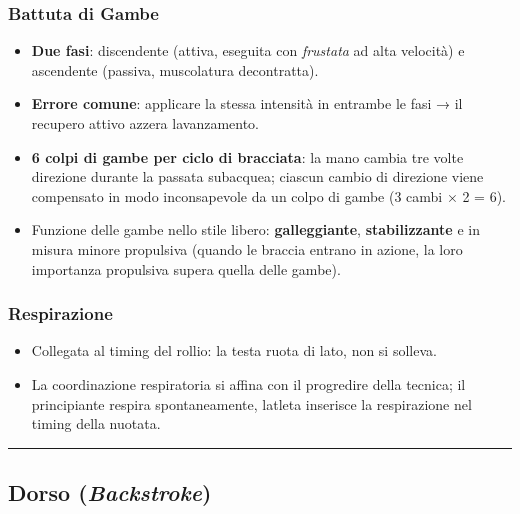 \documentclass[a4paper,11pt]{article}
\providecommand{\tightlist}{%
  \setlength{\itemsep}{0pt}\setlength{\parskip}{0pt}}
\begin{document}
\subsubsection{Battuta di Gambe}\label{battuta-di-gambe}

\begin{itemize}
      \tightlist
      \item
            \textbf{Due fasi}: discendente (attiva, eseguita con \emph{frustata}
            ad alta velocità) e ascendente (passiva, muscolatura decontratta).
      \item
            \textbf{Errore comune}: applicare la stessa intensità in entrambe le
            fasi → il recupero attivo azzera l\textquotesingle avanzamento.
      \item
            \textbf{6 colpi di gambe per ciclo di bracciata}: la mano cambia tre
            volte direzione durante la passata subacquea; ciascun cambio di
            direzione viene compensato in modo inconsapevole da un colpo di gambe
            (3 cambi × 2 = 6).
      \item
            Funzione delle gambe nello stile libero: \textbf{galleggiante},
            \textbf{stabilizzante} e in misura minore propulsiva (quando le
            braccia entrano in azione, la loro importanza propulsiva supera quella
            delle gambe).
\end{itemize}

\subsubsection{Respirazione}\label{respirazione}

\begin{itemize}
      \tightlist
      \item
            Collegata al timing del rollio: la testa ruota di lato, non si
            solleva.
      \item
            La coordinazione respiratoria si affina con il progredire della
            tecnica; il principiante respira spontaneamente,
            l\textquotesingle atleta inserisce la respirazione nel timing della
            nuotata.
\end{itemize}

\begin{center}\rule{0.5\linewidth}{0.5pt}\end{center}

\subsection{\texorpdfstring{Dorso
            (\emph{Backstroke})}{Dorso (Backstroke)}}\label{dorso-backstroke}
\end{document}
